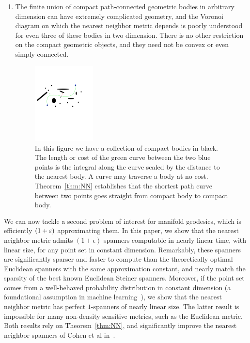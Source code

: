 \begin{enumerate}
 \item The finite union of compact path-connected geometric bodies in arbitrary
 dimension can have extremely complicated geometry, and the Voronoi diagram
on which the nearest neighbor metric depends is poorly understood for even
three of these bodies in two dimension.  There is no other restriction on
the compact geometric objects, and they need not be convex or even simply
connected.
\begin{figure}[htbp]
  \centering
    \includegraphics[width=0.3\textwidth]{Figures/example1.pdf}
    \caption{In this figure we have a collection of compact bodies in black.
      The length or cost of the green curve between the two blue points
      is the integral along the curve scaled by the distance to the nearest body.
    A curve may traverse a body at  no cost. Theorem~\ref{thm:NN}
establishes that the shortest path curve between two points goes straight
from compact body to compact body.}
  \label{fig:example1}
\end{figure}
\end{enumerate}

We can now tackle a second problem of interest for manifold geodesics,
which is efficiently $(1+\varepsilon)$ approximating them. In this paper, we show
that the nearest neighbor metric admits $(1+\epsilon)$ spanners computable
in nearly-linear time, with linear size, for any point set in constant
dimension. Remarkably, these spanners are significantly sparser and faster
to compute than the theoretically optimal Euclidean spanners with the same
approximation constant, and nearly match the sparsity of the best known
Euclidean Steiner spanners. Moreover, if the point set comes from a
well-behaved probability distribution in constant dimension (a foundational
assumption in machine learning~\cite{hwang2016}), we show that the nearest neighbor
metric has perfect $1$-spanners of nearly linear size. The latter result is
impossible for many non-density sensitive metrics, such as the Euclidean
metric. Both results rely on Theorem~\ref{thm:NN}, and significantly
improve the nearest neighbor spanners of Cohen et al in~\cite{cohen15approximating}.

